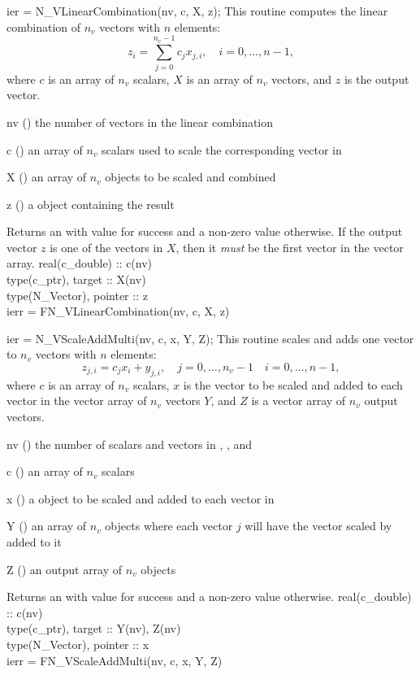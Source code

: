 {
  ier = N\_VLinearCombination(nv, c, X, z);
}
{
  This routine computes the linear combination of $n_v$ vectors with $n$
  elements:
  \begin{equation*}
    z_i = \sum_{j=0}^{n_v-1} c_j x_{j,i}, \quad i=0,\ldots,n-1,
  \end{equation*}
  where $c$ is an array of $n_v$ scalars, $X$ is an array of $n_v$ vectors,
  and $z$ is the output vector.
}
{
  \begin{args}[nv]
  \item[nv] () the number of vectors in the linear combination 
  \item[c] () an array of $n_v$ scalars used to scale
    the corresponding vector in 
  \item[X] () an array of $n_v$ {\nvector} objects 
    to be scaled and combined
  \item[z] () a {\nvector} object containing the result 
  \end{args}
}
{
  Returns an  with value  for success and a non-zero value otherwise.
}
{
  If the output vector $z$ is one of the vectors in $X$, then it \textit{must} be
  the first vector in the vector array.
}
{
  real(c\_double) :: c(nv)\\
  type(c\_ptr), target :: X(nv)\\
  type(N\_Vector), pointer :: z\\
  ierr = FN\_VLinearCombination(nv, c, X, z)
}

{
  ier = N\_VScaleAddMulti(nv, c, x, Y, Z);
}
{
  This routine scales and adds one vector to $n_v$ vectors with $n$ elements:
  \begin{equation*}
    z_{j,i} = c_j x_i + y_{j,i}, \quad j=0,\ldots,n_v-1 \quad i=0,\ldots,n-1,
  \end{equation*}
  where $c$ is an array of $n_v$ scalars, $x$ is the vector to be scaled and
  added to each vector in the vector array of $n_v$ vectors $Y$, and $Z$ is a
  vector array of $n_v$ output vectors.
}
{
  \begin{args}[nv]
  \item[nv] () the number of scalars and vectors in , , and 
  \item[c] () an array of $n_v$ scalars
  \item[x] () a {\nvector} object to be scaled and added to each
    vector in 
  \item[Y] () an array of $n_v$ {\nvector} objects where each vector
    $j$ will have the vector  scaled by  added to it
  \item[Z] () an output array of $n_v$ {\nvector} objects 
  \end{args}
}
{
  Returns an  with value  for success and a non-zero value otherwise.
}
{}
{
  real(c\_double) :: c(nv)\\
  type(c\_ptr), target :: Y(nv), Z(nv)\\
  type(N\_Vector), pointer :: x\\
  ierr = FN\_VScaleAddMulti(nv, c, x, Y, Z)
}

